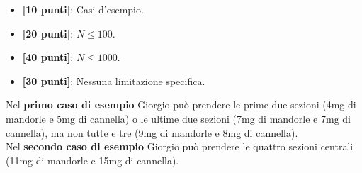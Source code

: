\begin{itemize}[nolistsep,itemsep=2mm]
  \item \textbf{ [10 punti]}: Casi d'esempio.
  \item \textbf{ [20 punti]}: $N \leq 100$.
  \item \textbf{ [40 punti]}: $N \leq 1000$.
  \item \textbf{ [30 punti]}: Nessuna limitazione specifica.
\end{itemize}

\Examples
\begin{example}
%
\end{example}
\begin{example}
%
\end{example}


\Explanation
Nel \textbf{primo caso di esempio} Giorgio può prendere le prime due sezioni (4mg di mandorle e 5mg di cannella) o le ultime due sezioni (7mg di mandorle e 7mg di cannella), ma non tutte e tre (9mg di mandorle e 8mg di cannella).\\[2mm]
Nel \textbf{secondo caso di esempio} Giorgio può prendere le quattro sezioni centrali (11mg di mandorle e 15mg di cannella).
